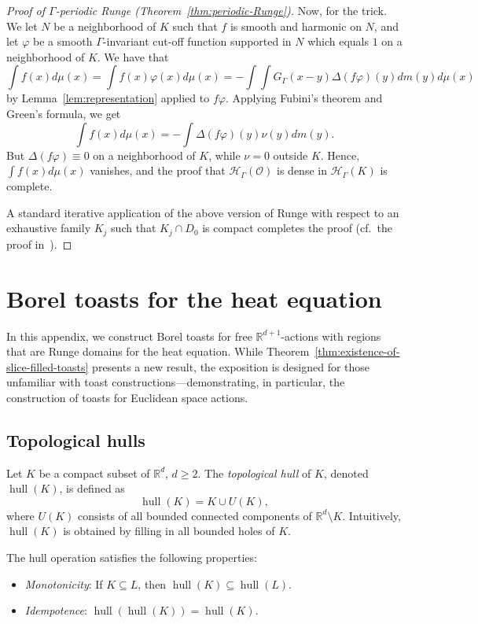 \documentclass[12pt]{paper}
\numberwithin{equation}{section}
\theoremstyle{plain}
\theoremstyle{definition}
\newcommand{\R}{\mathbb{R}}
\newcommand{\Rd}{\mathbb{R}^{d}}
\DeclareMathOperator{\hull}{\mathrm{hull}}
\begin{document}
\begin{proof}[Proof of \(\Gamma\)-periodic Runge (Theorem~\ref{thm:periodic-Runge})]
  Now, for the trick. We let \(N\) be a neighborhood of \(K\) such that \(f\) is smooth and harmonic
  on \(N\), and let \(\varphi\) be a smooth \(\Gamma\)-invariant cut-off function supported in \(N\)
  which equals \(1\) on a neighborhood of \(K\). We have that
  \[
    \int f(x)d\mu(x)=\int f(x)\varphi(x)d\mu(x) =-\int\int G_\Gamma(x-y)\Delta (f\varphi)(y)
    dm(y)d\mu(x)
  \]
  by Lemma~\ref{lem:representation} applied to \(f\varphi\).  Applying Fubini's theorem and Green's
  formula, we get
  \[
    \int f(x)d\mu(x)=-\int \Delta (f\varphi) (y)\nu(y) dm(y).
  \]
  But \(\Delta (f\varphi)\equiv 0\) on a neighborhood of \(K\), while \(\nu=0\) outside
  \(K\). Hence, \(\int f(x)d\mu(x)\) vanishes, and the proof that
  \(\mathcal{H}_\Gamma(\mathcal{O})\) is dense in \(\mathcal{H}_\Gamma(K)\) is complete.

  \medskip

  A standard iterative application of the above version of Runge with respect to an exhaustive
  family \(K_j\) such that \(K_j\cap D_0\) is compact completes the proof (cf.\ the proof
  in~\cite{bagbyUniformHarmonicApproximation1994}).
\end{proof}


\section{Borel toasts for the heat equation}
\label{sec:borel-toasts-heat}

In this appendix, we construct Borel toasts for free \(\R^{d+1}\)-actions with regions that
are Runge domains for the heat equation. While Theorem~\ref{thm:existence-of-slice-filled-toasts}
presents a new result, the exposition is designed for those unfamiliar with toast
constructions---demonstrating, in particular, the construction of toasts for Euclidean space
actions.

\subsection{Topological hulls}
\label{sec:topological-hull}

Let \(K\) be a compact subset of \(\Rd\), \(d\ge 2\).
The \emph{topological hull} of \(K\), denoted
\(\hull(K)\), is defined as
\[
\hull(K) = K \cup U(K),
\]
where \(U(K)\) consists of all bounded connected components of \(\Rd \setminus K\). Intuitively,
\(\hull(K)\) is obtained by filling in all bounded holes of \(K\).

The hull operation satisfies the following properties:
\begin{itemize}
  \item \emph{Monotonicity}: If \(K \subseteq L\), then \(\hull(K) \subseteq \hull(L)\).
  \item \emph{Idempotence}: \(\hull(\hull(K)) = \hull(K)\).
\end{itemize}
\end{document}
